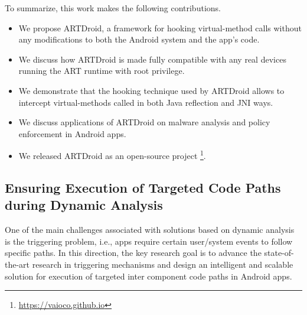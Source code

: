 To summarize, this work makes the following contributions.

\begin{itemize}
\item We propose ARTDroid, a framework for hooking virtual-method calls without any modifications to both the Android system and the app's code.
\item We discuss how ARTDroid is made fully compatible with any real devices running the ART runtime with root privilege.
\item We demonstrate that the hooking technique used by ARTDroid allows to intercept virtual-methods called in both Java reflection and JNI ways.
\item We discuss applications of ARTDroid on malware analysis and policy enforcement in Android apps.
\item We released ARTDroid as an open-source project \footnote{\url{https://vaioco.github.io}}. 
\end{itemize}


\subsection{Ensuring Execution of Targeted Code Paths during Dynamic Analysis}

One of the main challenges associated with solutions based on dynamic analysis is the triggering problem, i.e., apps require certain user/system events to follow specific paths. In this direction, the key research goal is to advance the state-of-the-art research in triggering mechanisms and design an intelligent and scalable solution for execution of targeted inter component code paths in Android apps.

